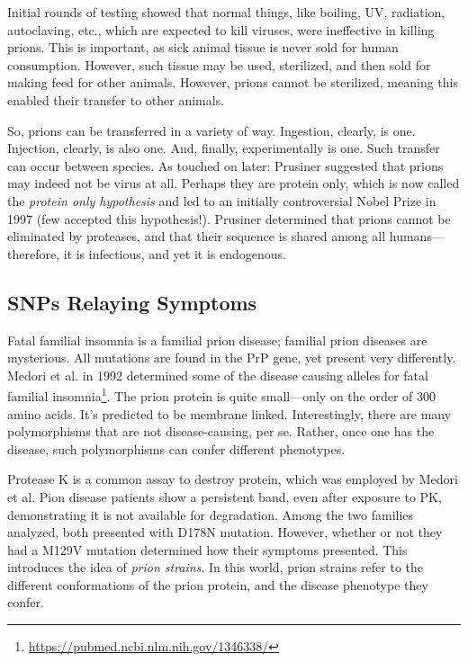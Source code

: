 Initial rounds of testing showed that normal things, like boiling, UV, radiation, autoclaving, etc., which are expected to kill viruses, were ineffective in killing prions. This is important, as sick animal tissue is never sold for human consumption. However, such tissue may be used, sterilized, and then sold for making feed for other animals. However, prions cannot be sterilized, meaning this enabled their transfer to other animals. \newline

So, prions can be transferred in a variety of way. Ingestion, clearly, is one. Injection, clearly, is also one. And, finally, experimentally is one. Such transfer can occur between species. As touched on later: Prusiner suggested that prions may indeed not be virus at all. Perhaps they are protein only, which is now called the \textit{protein only hypothesis} and led to an initially controversial Nobel Prize in 1997 (few accepted this hypothesis!). Prusiner determined that prions cannot be eliminated by proteases, and that their sequence is shared among all humans---therefore, it is infectious, and yet it is endogenous. 

\subsection*{SNPs Relaying Symptoms}

Fatal familial insomnia is a familial prion disease;  familial prion diseases are mysterious. All mutations are found in the PrP gene, yet  present very differently. Medori et al. in  1992 determined some of the disease causing alleles for fatal familial insomnia\footnote{\url{https://pubmed.ncbi.nlm.nih.gov/1346338/}}. The prion protein is quite small---only on the order of 300 amino acids. It's predicted to be membrane linked. Interestingly, there are many polymorphisms that are not disease-causing, per se. Rather, once one has the disease, such polymorphisms can confer different phenotypes.\newline

Protease K is a common assay to destroy protein, which was employed by Medori et al. Pion disease patients show a persistent band, even after exposure to PK, demonstrating it is not available for degradation. Among the two families analyzed, both presented with D178N mutation. However, whether or not they had a M129V mutation determined how their symptoms presented. This introduces the idea of \textit{prion strains}. In this world, prion strains refer to the different conformations of the prion protein, and the disease phenotype they confer. 

